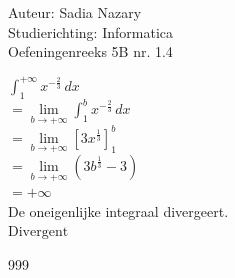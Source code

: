 \documentclass[a4paper]{article}
\begin{document}
\noindent \large Auteur: Sadia Nazary \\
\noindent \large Studierichting: Informatica\\
\noindent \large Oefeningenreeks 5B nr. 1.4\\

\medskip

\normalsize

$\displaystyle \int_1^{+\infty}x^{-\tfrac{2}{3}}\,dx$\\

$=
\displaystyle \lim\limits_{b\to+\infty}
\int_1^b x^{-\tfrac{2}{3}}\,dx$\\

$=
\displaystyle \lim\limits_{b\to+\infty}
\left[
3x^{\tfrac{1}{3}}
\right]_1^b$\\

$=
\displaystyle \lim\limits_{b\to+\infty}
\left(
3b^{\tfrac{1}{3}}-3
\right)$\\

$=
+\infty$\\

De oneigenlijke integraal divergeert.\\

$\boxed{\text{Divergent}}$\\

\begin{thebibliography}{999}
\end{thebibliography}
\end{document}
